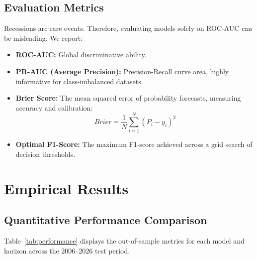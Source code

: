 \documentclass[11pt]{article}
\begin{document}
\subsection{Evaluation Metrics}
Recessions are rare events. Therefore, evaluating models solely on ROC-AUC can be misleading. We report:
\begin{itemize}
    \item \textbf{ROC-AUC:} Global discriminative ability.
    \item \textbf{PR-AUC (Average Precision):} Precision-Recall curve area, highly informative for class-imbalanced datasets.
    \item \textbf{Brier Score:} The mean squared error of probability forecasts, measuring accuracy and calibration:
    \begin{equation}
    Brier = \frac{1}{N}\sum_{i=1}^N (P_i - y_i)^2
    \end{equation}
    \item \textbf{Optimal F1-Score:} The maximum F1-score achieved across a grid search of decision thresholds.
\end{itemize}

\section{Empirical Results}
\subsection{Quantitative Performance Comparison}
Table~\ref{tab:performance} displays the out-of-sample metrics for each model and horizon across the 2006--2026 test period.
\end{document}
